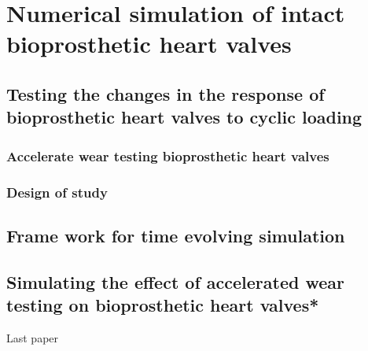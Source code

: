 \chapter{Numerical simulation of intact bioprosthetic heart valves}

\section{Testing the changes in the response of bioprosthetic heart valves to cyclic loading}
\subsection{Accelerate wear testing bioprosthetic heart valves}
\subsection{Design of study}

\section{Frame work for time evolving simulation}

\section{Simulating the effect of accelerated wear testing on bioprosthetic heart valves*}

Last paper